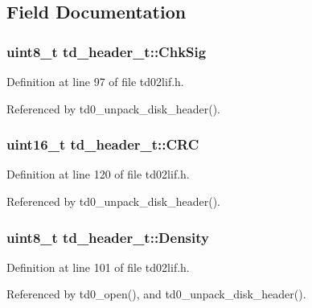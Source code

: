 \subsection{Field Documentation}
\subsubsection[{\texorpdfstring{Chk\+Sig}{ChkSig}}]{\setlength{\rightskip}{0pt plus 5cm}uint8\+\_\+t td\+\_\+header\+\_\+t\+::\+Chk\+Sig}\hypertarget{structtd__header__t_ad226c52f8f8481b0ebf826dd3128ba3d}{}\label{structtd__header__t_ad226c52f8f8481b0ebf826dd3128ba3d}


Definition at line 97 of file td02lif.\+h.



Referenced by td0\+\_\+unpack\+\_\+disk\+\_\+header().

\subsubsection[{\texorpdfstring{C\+RC}{CRC}}]{\setlength{\rightskip}{0pt plus 5cm}uint16\+\_\+t td\+\_\+header\+\_\+t\+::\+C\+RC}\hypertarget{structtd__header__t_ae51197a200b65947359773f1aeea9c2d}{}\label{structtd__header__t_ae51197a200b65947359773f1aeea9c2d}


Definition at line 120 of file td02lif.\+h.



Referenced by td0\+\_\+unpack\+\_\+disk\+\_\+header().

\subsubsection[{\texorpdfstring{Density}{Density}}]{\setlength{\rightskip}{0pt plus 5cm}uint8\+\_\+t td\+\_\+header\+\_\+t\+::\+Density}\hypertarget{structtd__header__t_a09c0c52ec99733db61dd6f3c7d052325}{}\label{structtd__header__t_a09c0c52ec99733db61dd6f3c7d052325}


Definition at line 101 of file td02lif.\+h.



Referenced by td0\+\_\+open(), and td0\+\_\+unpack\+\_\+disk\+\_\+header().

